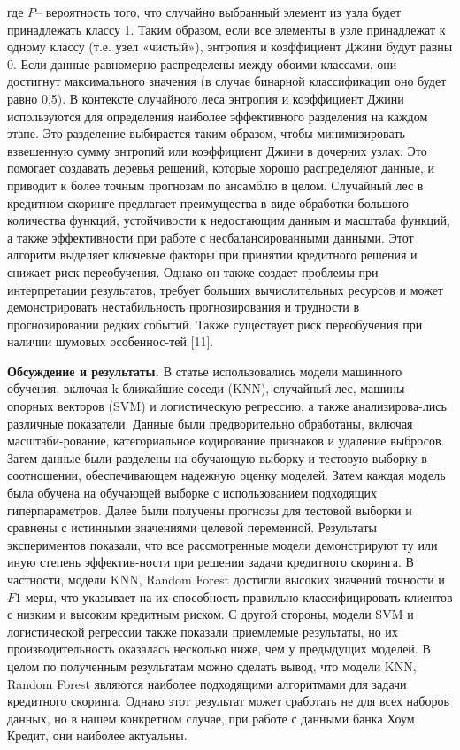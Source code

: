 \begin{multicols}{2}

где $P$-- вероятность того, что случайно
выбранный элемент из узла будет принадлежать классу 1. Таким образом,
если все элементы в узле принадлежат к одному классу (т.е. узел
«чистый»), энтропия и коэффициент Джини будут равны 0. Если данные
равномерно распределены между обоими классами, они достигнут
максимального значения (в случае бинарной классификации оно будет равно
0,5). В контексте случайного леса энтропия и коэффициент Джини
используются для определения наиболее эффективного разделения на каждом
этапе. Это разделение выбирается таким образом, чтобы минимизировать
взвешенную сумму энтропий или коэффициент Джини в дочерних узлах. Это
помогает создавать деревья решений, которые хорошо распределяют данные,
и приводит к более точным прогнозам по ансамблю в целом. Случайный лес в
кредитном скоринге предлагает преимущества в виде обработки большого
количества функций, устойчивости к недостающим данным и масштаба
функций, а также эффективности при работе с несбалансированными данными.
Этот алгоритм выделяет ключевые факторы при принятии кредитного решения
и снижает риск переобучения. Однако он также создает проблемы при
интерпретации результатов, требует больших вычислительных ресурсов и
может демонстрировать нестабильность прогнозирования и трудности в
прогнозировании редких событий. Также существует риск переобучения при
наличии шумовых особеннос-тей {[}11{]}.

{\bfseries Обсуждение и результаты.} В статье использовались модели
машинного обучения, включая k-ближайшие соседи (KNN), случайный лес,
машины опорных векторов (SVM) и логистическую регрессию, а также
анализирова-лись различные показатели. Данные были предворительно
обработаны, включая масштаби-рование, категориальное кодирование
признаков и удаление выбросов. Затем данные были разделены на обучающую
выборку и тестовую выборку в соотношении, обеспечивающем надежную оценку
моделей. Затем каждая модель была обучена на обучающей выборке с
использованием подходящих гиперпараметров. Далее были получены прогнозы
для тестовой выборки и сравнены с истинными значениями целевой
переменной. Результаты экспериментов показали, что все рассмотренные
модели демонстрируют ту или иную степень эффектив-ности при решении
задачи кредитного скоринга. В частности, модели KNN, Random Forest
достигли высоких значений точности и $F1$-меры, что указывает на их
способность правильно классифицировать клиентов с низким и высоким
кредитным риском. С другой стороны, модели SVM и логистической регрессии
также показали приемлемые результаты, но их производительность оказалась
несколько ниже, чем у предыдущих моделей. В целом по полученным
результатам можно сделать вывод, что модели KNN, Random Forest являются
наиболее подходящими алгоритмами для задачи кредитного скоринга. Однако
этот результат может сработать не для всех наборов данных, но в нашем
конкретном случае, при работе с данными банка Хоум Кредит, они наиболее
актуальны.


\end{multicols}
